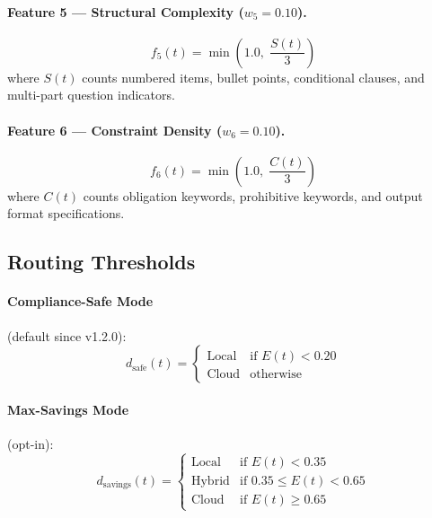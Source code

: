 \documentclass[11pt,a4paper]{article}
\begin{document}
\paragraph{Feature 5 --- Structural Complexity ($w_5 = 0.10$).}
\begin{equation}
  f_5(t) = \min\!\left(1.0,\; \frac{S(t)}{3}\right)
\end{equation}
where $S(t)$ counts numbered items, bullet points, conditional clauses, and
multi-part question indicators.

\paragraph{Feature 6 --- Constraint Density ($w_6 = 0.10$).}
\begin{equation}
  f_6(t) = \min\!\left(1.0,\; \frac{C(t)}{3}\right)
\end{equation}
where $C(t)$ counts obligation keywords, prohibitive keywords, and output format
specifications.

\subsection{Routing Thresholds}

\paragraph{Compliance-Safe Mode} (default since v1.2.0):
\begin{equation}
  d_{\mathrm{safe}}(t) = \begin{cases}
    \text{Local} & \text{if } E(t) < 0.20 \\
    \text{Cloud} & \text{otherwise}
  \end{cases}
\end{equation}

\paragraph{Max-Savings Mode} (opt-in):
\begin{equation}
  d_{\mathrm{savings}}(t) = \begin{cases}
    \text{Local}  & \text{if } E(t) < 0.35 \\
    \text{Hybrid} & \text{if } 0.35 \leq E(t) < 0.65 \\
    \text{Cloud}  & \text{if } E(t) \geq 0.65
  \end{cases}
\end{equation}
\end{document}
